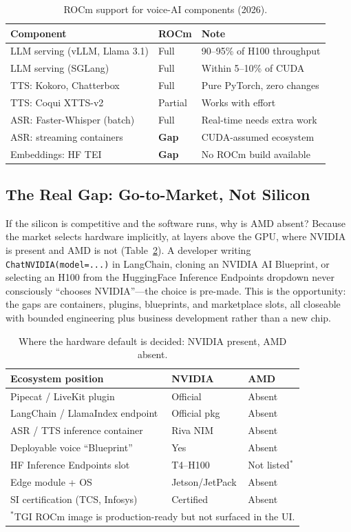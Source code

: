 \documentclass[blind]{gtac}
\begin{document}
\begin{table}[H]
\centering
\caption{ROCm support for voice-AI components (2026).}
\label{tab:compat}
\tiny
\begin{tabular}{@{}lll@{}}
\toprule
Component & ROCm & Note \\
\midrule
LLM serving (vLLM, Llama 3.1) & Full & 90--95\% of H100 throughput \\
LLM serving (SGLang) & Full & Within 5--10\% of CUDA \\
TTS: Kokoro, Chatterbox & Full & Pure PyTorch, zero changes \\
TTS: Coqui XTTS-v2 & Partial & Works with effort \\
ASR: Faster-Whisper (batch) & Full & Real-time needs extra work \\
ASR: streaming containers & \textbf{Gap} & CUDA-assumed ecosystem \\
Embeddings: HF TEI & \textbf{Gap} & No ROCm build available \\
\bottomrule
\end{tabular}
\end{table}

\subsection{The Real Gap: Go-to-Market, Not Silicon}

If the silicon is competitive and the software runs, why is AMD absent? Because the market selects hardware implicitly, at layers above the GPU, where NVIDIA is present and AMD is not (Table~\ref{tab:gap}). A developer writing \texttt{ChatNVIDIA(model=...)} in LangChain, cloning an NVIDIA AI Blueprint, or selecting an H100 from the HuggingFace Inference Endpoints dropdown never consciously ``chooses NVIDIA''---the choice is pre-made. This is the opportunity: the gaps are containers, plugins, blueprints, and marketplace slots, all closeable with bounded engineering plus business development rather than a new chip.

\begin{table}[H]
\centering
\caption{Where the hardware default is decided: NVIDIA present, AMD absent.}
\label{tab:gap}
\tiny
\begin{tabular}{@{}lll@{}}
\toprule
Ecosystem position & NVIDIA & AMD \\
\midrule
Pipecat / LiveKit plugin & Official & Absent \\
LangChain / LlamaIndex endpoint & Official pkg & Absent \\
ASR / TTS inference container & Riva NIM & Absent \\
Deployable voice ``Blueprint'' & Yes & Absent \\
HF Inference Endpoints slot & T4--H100 & Not listed$^{*}$ \\
Edge module + OS & Jetson/JetPack & Absent \\
SI certification (TCS, Infosys) & Certified & Absent \\
\bottomrule
\multicolumn{3}{l}{$^{*}$TGI ROCm image is production-ready but not surfaced in the UI.}
\end{tabular}
\end{table}
\end{document}
